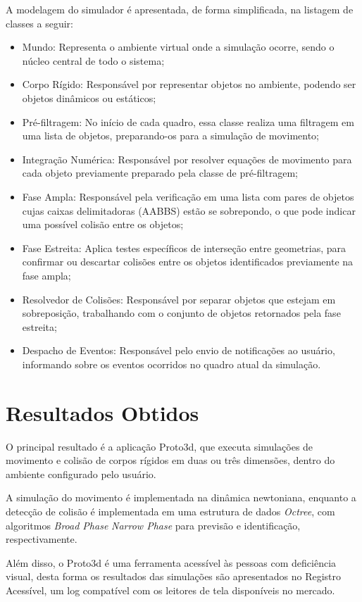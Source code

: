 \documentclass[12pt]{article}
\begin{document}
A modelagem do simulador é apresentada, de forma simplificada, na listagem de classes a seguir:

\begin{itemize}
\item Mundo: Representa o ambiente virtual onde a simulação ocorre, sendo o núcleo central de todo o sistema;
\item Corpo Rígido: Responsável por representar objetos no ambiente, podendo ser objetos dinâmicos ou estáticos;
\item Pré-filtragem: No início de cada quadro, essa classe realiza uma filtragem em uma lista de objetos, preparando-os para a simulação de movimento;
\item Integração Numérica: Responsável por resolver equações de movimento para cada objeto previamente preparado pela classe de pré-filtragem;
\item Fase Ampla: Responsável pela verificação em uma lista com pares de objetos cujas caixas delimitadoras (AABBS) estão se sobrepondo, o que pode indicar uma possível colisão entre os objetos;
\item Fase Estreita: Aplica testes específicos de interseção entre geometrias, para confirmar ou descartar colisões entre os objetos identificados previamente na fase ampla;
\item Resolvedor de Colisões: Responsável por separar objetos que estejam em sobreposição, trabalhando com o conjunto de objetos retornados pela fase estreita;
\item Despacho de Eventos: Responsável pelo envio de notificações ao usuário, informando sobre os eventos ocorridos no quadro atual da simulação.
\end{itemize}

\section{Resultados Obtidos}
O principal resultado é a aplicação Proto3d, que executa simulações de movimento e colisão de corpos rígidos em duas ou três dimensões, dentro do ambiente configurado pelo usuário. 

A simulação do movimento é implementada na dinâmica newtoniana, enquanto a detecção de colisão é implementada em uma estrutura de dados \emph{Octree}, com algoritmos \emph{Broad Phase} \emph{Narrow Phase} para previsão e identificação, respectivamente.

Além disso, o Proto3d é uma ferramenta acessível às pessoas com deficiência visual, desta forma os resultados das simulações são apresentados no Registro Acessível, um log compatível com os leitores de tela disponíveis no mercado.
\end{document}
